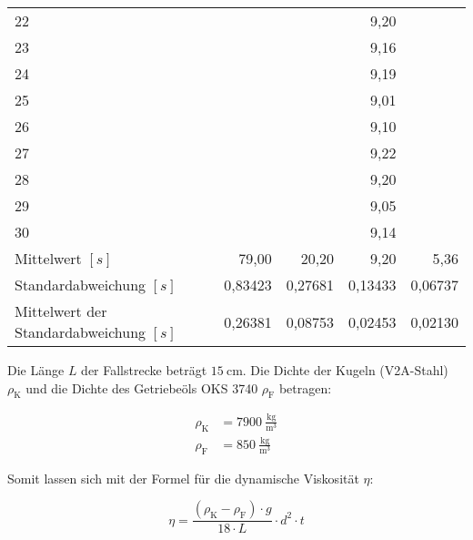 \begin{table}[H]
\begin{tabular}{|l||r|r|r|r|}
                    22 &         &          & 9,20    &     \\
                    23 &         &          & 9,16    &     \\
                    24 &         &          & 9,19    &     \\
                    25 &         &          & 9,01    &     \\
                    26 &         &          & 9,10    &     \\
                    27 &         &          & 9,22    &     \\
                    28 &         &          & 9,20    &     \\
                    29 &         &          & 9,05    &     \\
                    30 &         &          & 9,14    &     \\
                    \hline
                    Mittelwert $[s]$ & 79,00 & 20,20 & 9,20 & 5,36\\
                    Standardabweichung $[s]$ & 0,83423 & 0,27681 & 0,13433 & 0,06737\\
                    Mittelwert der Standardabweichung $[s]$ & 0,26381 & 0,08753 & 0,02453 & 0,02130\\
                    \hline
                \end{tabular}
                \label{tab:MesswerteFallzeiten}
            \end{table}

            Die Länge $L$ der Fallstrecke beträgt $15\ \mathrm{cm}$. Die Dichte der Kugeln (V2A-Stahl) $\rho_{\mathrm{K}}$ und die Dichte des Getriebeöls OKS 3740 $\rho_{\mathrm{F}}$ betragen:

            \begin{align}
                \rho_{\mathrm{K}} &= 7900\ \mathrm{\frac{kg}{m^{3}}}\\
                \rho_{\mathrm{F}} &= 850\ \mathrm{\frac{kg}{m^{3}}}
            \end{align}

            Somit lassen sich mit der Formel für die dynamische Viskosität $\eta$:

            \begin{equation}
                \eta = \frac{(\rho_{\mathrm{K}} - \rho_{\mathrm{F}}) \cdot g}{18 \cdot L} \cdot d^{2} \cdot t
                \label{eq:dynamischeViskosität}
            \end{equation}

